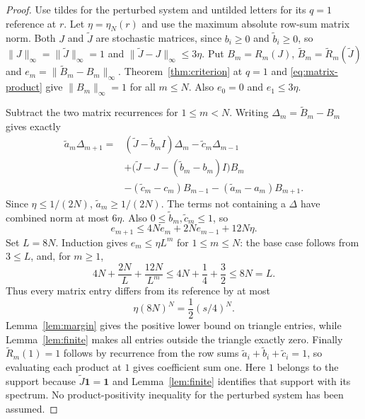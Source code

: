 \begin{proof}
Use tildes for the perturbed system and untilded letters for its $q=1$ reference at $r$. Let $\eta=\eta_N(r)$ and use the maximum absolute row-sum matrix norm. Both $J$ and $\widetilde J$ are stochastic matrices, since $b_i\geq0$ and $\widetilde b_i\geq0$, so $\|J\|_\infty=\|\widetilde J\|_\infty=1$ and $\|\widetilde J-J\|_\infty\leq3\eta$. Put $B_m=R_m(J)$, $\widetilde B_m=\widetilde R_m(\widetilde J)$ and $e_m=\|\widetilde B_m-B_m\|_\infty$. Theorem~\ref{thm:criterion} at $q=1$ and \eqref{eq:matrix-product} give $\|B_m\|_\infty=1$ for all $m\leq N$. Also $e_0=0$ and $e_1\leq3\eta$.

Subtract the two matrix recurrences for $1\leq m<N$. Writing $\Delta_m=\widetilde B_m-B_m$ gives exactly
\begin{align*}
\widetilde a_m\Delta_{m+1}
={}&(\widetilde J-\widetilde b_m I)\Delta_m-\widetilde c_m\Delta_{m-1}\\
 &+\big(\widetilde J-J-(\widetilde b_m-b_m)I\big)B_m\\
 &-(\widetilde c_m-c_m)B_{m-1}-(\widetilde a_m-a_m)B_{m+1}.
\end{align*}
Since $\eta\leq1/(2N)$, $\widetilde a_m\geq1/(2N)$. The terms not containing a $\Delta$ have combined norm at most $6\eta$. Also $0\leq\widetilde b_m,\widetilde c_m\leq1$, so
\begin{equation}\label{eq:error-recursion}
e_{m+1}\leq4Ne_m+2Ne_{m-1}+12N\eta.
\end{equation}
Set $L=8N$. Induction gives $e_m\leq\eta L^m$ for $1\leq m\leq N$: the base case follows from $3\leq L$, and, for $m\geq1$,
\[
4N+\frac{2N}{L}+\frac{12N}{L^m}
\leq4N+\frac14+\frac32\leq8N=L.
\]
Thus every matrix entry differs from its reference by at most
\[
\eta(8N)^N=\frac12(s/4)^N.
\]
Lemma~\ref{lem:margin} gives the positive lower bound on triangle entries, while Lemma~\ref{lem:finite} makes all entries outside the triangle exactly zero. Finally $\widetilde R_m(1)=1$ follows by recurrence from the row sums $\widetilde a_i+\widetilde b_i+\widetilde c_i=1$, so evaluating each product at $1$ gives coefficient sum one. Here $1$ belongs to the support because $\widetilde J\boldsymbol1=\boldsymbol1$ and Lemma~\ref{lem:finite} identifies that support with its spectrum. No product-positivity inequality for the perturbed system has been assumed.
\end{proof}

